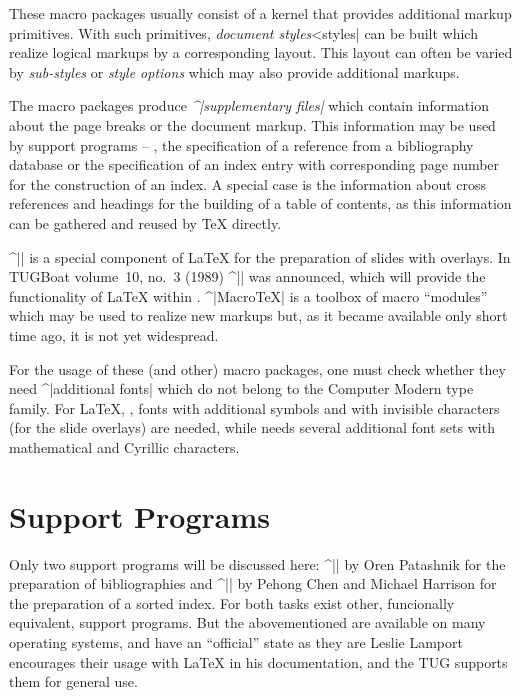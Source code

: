 These macro packages usually consist of a kernel that
provides additional markup primitives. With such primitives,
{\it document styles\/}^^|styles| can be built which realize logical
markups by a corresponding layout. This layout can often be varied by
{\it sub-styles\/} or {\it style options\/} which may also provide
additional markups.

The macro packages produce {\it ^|supplementary files|\/} which contain
information about the page breaks or the document markup. This
information may be used by support programs -- \eg{}, the
specification of a reference from a bibliography database or the
specification of an index entry with corresponding page number for the
construction of an index. A special case is the information about
cross references and headings for the building of a table of contents,
as this information can be gathered and reused by \TeX{} directly.

^|\SliTeX{}| is a special component of \LaTeX{} for the preparation
of slides with overlays. In TUGBoat volume~10, no.~3 (1989)
^|\LAMSTeX{}| was announced, which will provide the functionality of
\LaTeX{} within \AmSTeX{}. ^|Macro\TeX{}| is a toolbox of macro
``modules'' which may be used to realize new markups but, as it
became available only short time ago, it is not yet widespread.

For the usage of these (and other) macro packages, one must check
whether they need ^|additional fonts| which do not belong to the Computer
Modern type family. For \LaTeX{}, \eg{}, fonts with additional symbols
and with invisible characters (for the slide overlays) are needed,
while \AmSTeX{} needs several additional font sets with mathematical and
Cyrillic characters.



\section{Support Programs}

Only two support programs will be discussed here: ^|\BibTeX{}| by
{\sc Oren Patashnik} for the preparation of bibliographies and
^|\MakeIndex{}| by {\sc Pehong Chen} and {\sc Michael Harrison} for
the preparation of a sorted index. For both tasks exist other,
funcionally equivalent, support programs. But the abovementioned are
available on many operating systems, and have an ``official'' state
as they are {\sc Leslie Lamport} encourages their usage with
\LaTeX{} in his documentation, and the TUG supports them for general use.

